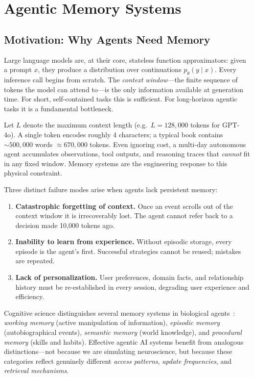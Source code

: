 \chapter{Agentic Memory Systems}
\label{sec:agentic-memory}

\section{Motivation: Why Agents Need Memory}
\label{sec:memory-motivation}

Large language models are, at their core, stateless function approximators: given a prompt $x$, they produce a distribution over continuations $p_\theta(y \mid x)$. Every inference call begins from scratch. The \emph{context window}---the finite sequence of tokens the model can attend to---is the only information available at generation time. For short, self-contained tasks this is sufficient. For long-horizon agentic tasks it is a fundamental bottleneck.

\begin{keybox}
Let $L$ denote the maximum context length (e.g.~$L = 128{,}000$ tokens for GPT-4o). A single token encodes roughly 4 characters; a typical book contains $\sim\!500{,}000$ words $\approx 670{,}000$ tokens. Even ignoring cost, a multi-day autonomous agent accumulates observations, tool outputs, and reasoning traces that \emph{cannot} fit in any fixed window. Memory systems are the engineering response to this physical constraint.
\end{keybox}

Three distinct failure modes arise when agents lack persistent memory:

\begin{enumerate}
  \item \textbf{Catastrophic forgetting of context.} Once an event scrolls out of the context window it is irrecoverably lost. The agent cannot refer back to a decision made 10,000 tokens ago.
  \item \textbf{Inability to learn from experience.} Without episodic storage, every episode is the agent’s first. Successful strategies cannot be reused; mistakes are repeated.
  \item \textbf{Lack of personalization.} User preferences, domain facts, and relationship history must be re-established in every session, degrading user experience and efficiency.
\end{enumerate}

\begin{intuitionbox}
Cognitive science distinguishes several memory systems in biological agents~\cite{tulving1985memory, squire1992declarative}: \emph{working memory} (active manipulation of information), \emph{episodic memory} (autobiographical events), \emph{semantic memory} (world knowledge), and \emph{procedural memory} (skills and habits). Effective agentic AI systems benefit from analogous distinctions---not because we are simulating neuroscience, but because these categories reflect genuinely different \emph{access patterns}, \emph{update frequencies}, and \emph{retrieval mechanisms}.
\end{intuitionbox}

